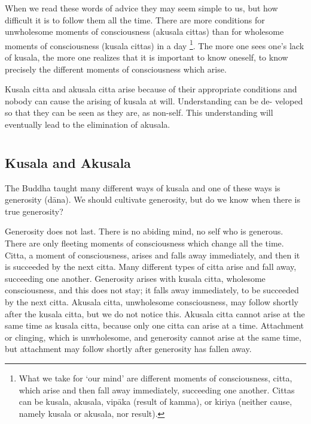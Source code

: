When we read these words of advice they may seem simple to us, but how
difficult it is to follow them all the time. There are more conditions
for unwholesome moments of consciousness (akusala cittas) than for
wholesome moments of consciousness (kusala cittas) in a day
\footnote{What we take for `our mind' are
different moments of consciousness, citta, which arise and then fall
away immediately, succeeding one another. Cittas can be kusala, akusala,
vipāka (result of kamma), or kiriya (neither cause, namely kusala or
akusala, nor result).}.
The more one sees one's lack of kusala, the more one realizes that it is
important to know oneself, to know precisely the different moments of
consciousness which arise.

Kusala citta and akusala citta arise because of their appropriate
conditions and nobody can cause the arising of kusala at will.
Understanding can be de- veloped so that they can be seen as they are,
as non-self. This understanding will eventually lead to the elimination
of akusala.



\chapter[Kusala and Akusal]{}
\section*{Kusala and Akusala}

The Buddha taught many different ways of kusala and one of these ways is
generosity (dāna). We should cultivate generosity, but do we know when
there is true generosity?

Generosity does not last. There is no abiding mind, no self who is
generous. There are only fleeting moments of consciousness which change
all the time. Citta, a moment of consciousness, arises and falls away
immediately, and then it is succeeded by the next citta. Many different
types of citta arise and fall away, succeeding one another. Generosity
arises with kusala citta, wholesome consciousness, and this does not
stay; it falls away immediately, to be succeeded by the next citta.
Akusala citta, unwholesome consciousness, may follow shortly after the
kusala citta, but we do not notice this. Akusala citta cannot arise at
the same time as kusala citta, because only one citta can arise at a
time. Attachment or clinging, which is unwholesome, and generosity
cannot arise at the same time, but attachment may follow shortly after
generosity has fallen away.

